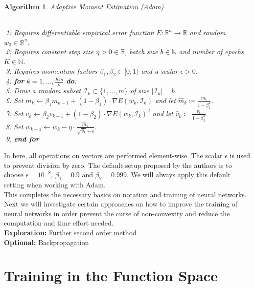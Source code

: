 \documentclass[11pt, a4paper]{article}
\newtheorem{algorithm}[theorem]{Algorithm}
\newcommand{\N}{\mathbb{N}}
\newcommand{\R}{\mathbb{R}}
\newcommand{\I}{\mathcal{I}}
\begin{document}
\begin{algorithm}
\caption{Adaptive Moment Estimation (Adam)} \ \\
\textcolor{white}{$\Big |$}1: Requires differentiable empirical error function $E: \R^n \to \R$ and random $w_0 \in \R^n$.  \\
\textcolor{white}{$\Big |$}2: Requires constant step size $\eta > 0 \in \R$, batch size $b \in \N$ and number of epochs $K \in \N$. \\
\textcolor{white}{$\Big |$}3: Requires momentum factors $\beta_1, \beta_2 \in [0,1)$ and a scalar $\epsilon > 0$. \\
\textcolor{white}{$\Big |$}4: \textbf{for} $k=1, \dots, \frac{Km}{b}$ \textbf{do}: \\
\textcolor{white}{$\Big |$}5: \quad Draw a random subset $\I_k \subset \{1, \dots, m \}$ of size $| \I_k | = b$. \\
\textcolor{white}{$\Big |$}6: \quad Set $m_{k} \leftarrow \beta_1 m_{k-1} + (1-\beta_1) \cdot \nabla E(w_k,\I_k)$ and let $\hat{m}_k \coloneq \frac{m_k}{1-\beta_1^k}$. \\
\textcolor{white}{$\Big |$}7: \quad Set $v_{k} \leftarrow \beta_2 v_{k-1} + (1-\beta_2) \cdot \nabla E(w_k,\I_k)^2$ and let $\hat{v}_k \coloneq \frac{v_k}{1-\beta_2^k}$. \\
\textcolor{white}{$\Big |$}8: \quad Set $w_{k+1} \leftarrow w_k - \eta \cdot \frac{\hat{m}_k}{\sqrt{\hat{v}_k} + \epsilon}$. \\
\textcolor{white}{$\Big |$}9: \textbf{end for}
\end{algorithm}

In here, all operations on vectors are performed element-wise. The scalar $\epsilon$ is used to prevent division by zero. The default setup proposed by the authors is to choose $\epsilon = 10^{-8}$, $\beta_1 = 0.9$ and $\beta_2 = 0.999$. We will always apply this default setting when working with Adam. \\

This completes the necessary basics on notation and training of neural networks. Next we will investigate certain approaches on how to improve the training of neural networks in order prevent the curse of non-convexity and reduce the computation and time effort needed.  \\

\textbf{Exploration:} Further second order method \\
\textbf{Optional:} Backpropagation

\pagebreak
\section{Training in the Function Space} \label{sec:functionspace}
\end{document}
